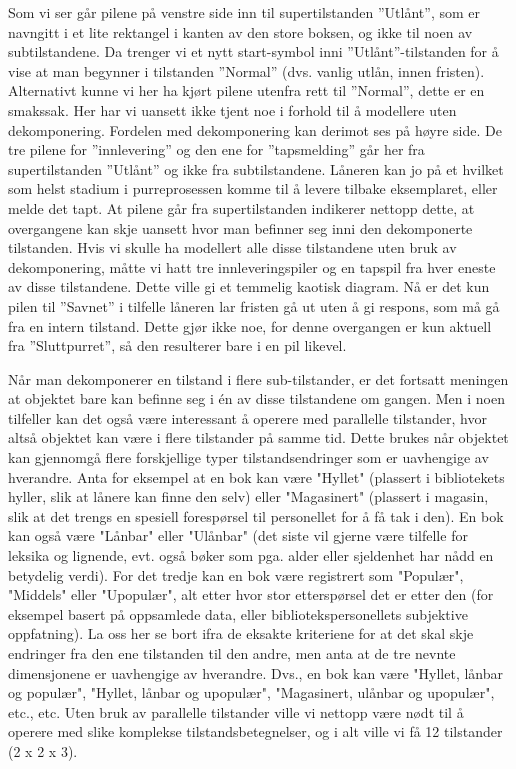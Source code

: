 Som vi ser går pilene på venstre side inn til supertilstanden ”Utlånt”, som er navngitt i et lite rektangel i kanten av den store boksen, og ikke til noen av subtilstandene. Da trenger vi et nytt start-symbol inni ”Utlånt”-tilstanden for å vise at man begynner i tilstanden ”Normal” (dvs. vanlig utlån, innen fristen). Alternativt kunne vi her ha kjørt pilene utenfra rett til ”Normal”, dette er en smakssak. Her har vi uansett ikke tjent noe i forhold til å modellere uten dekomponering. Fordelen med dekomponering kan derimot ses på høyre side. De tre pilene for ”innlevering” og den ene for ”tapsmelding” går her fra supertilstanden ”Utlånt” og ikke fra subtilstandene. Låneren kan jo på et hvilket som helst stadium i purreprosessen komme til å levere tilbake eksemplaret, eller melde det tapt. At pilene går fra supertilstanden indikerer nettopp dette, at overgangene kan skje uansett hvor man befinner seg inni den dekomponerte tilstanden. Hvis vi skulle ha modellert alle disse tilstandene uten bruk av dekomponering, måtte vi hatt tre innleveringspiler og en tapspil fra hver eneste av disse tilstandene. Dette ville gi et temmelig kaotisk diagram. Nå er det kun pilen til ”Savnet” i tilfelle låneren lar fristen gå ut uten å gi respons, som må gå fra en intern tilstand. Dette gjør ikke noe, for denne overgangen er kun aktuell fra ”Sluttpurret”, så den resulterer bare i en pil likevel.

Når man dekomponerer en tilstand i flere sub-tilstander, er det fortsatt meningen at objektet bare kan befinne seg i én av disse tilstandene om gangen. Men i noen tilfeller kan det også være interessant å operere med parallelle tilstander, hvor altså objektet kan være i flere tilstander på samme tid. Dette brukes når objektet kan gjennomgå flere forskjellige typer tilstandsendringer som er uavhengige av hverandre. Anta for eksempel at en bok kan være "Hyllet" (plassert i bibliotekets hyller, slik at lånere kan finne den selv) eller "Magasinert" (plassert i magasin, slik at det trengs en spesiell forespørsel til personellet for å få tak i den). En bok kan også være "Lånbar" eller "Ulånbar" (det siste vil gjerne være tilfelle for leksika og lignende, evt. også bøker som pga. alder eller sjeldenhet har nådd en betydelig verdi). For det tredje kan en bok være registrert som "Populær", "Middels" eller "Upopulær", alt etter hvor stor etterspørsel det er etter den (for eksempel basert på oppsamlede data, eller bibliotekspersonellets subjektive oppfatning). La oss her se bort ifra de eksakte kriteriene for at det skal skje endringer fra den ene tilstanden til den andre, men anta at de tre nevnte dimensjonene er uavhengige av hverandre. Dvs., en bok kan være "Hyllet, lånbar og populær", "Hyllet, lånbar og upopulær", "Magasinert, ulånbar og upopulær", etc., etc. Uten bruk av parallelle tilstander ville vi nettopp være nødt til å operere med slike komplekse tilstandsbetegnelser, og i alt ville vi få 12 tilstander (2 x 2 x 3).

